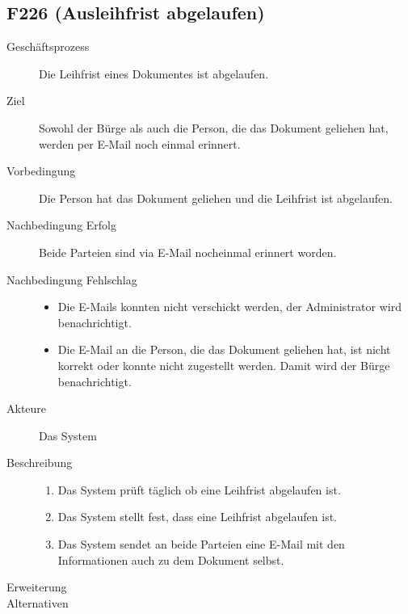 \subsection{F226 (Ausleihfrist abgelaufen)}
\begin{description}
  \item[Geschäftsprozess]Die Leihfrist eines Dokumentes ist abgelaufen.
  \item[Ziel]Sowohl der Bürge als auch die Person, die das Dokument geliehen hat, werden per E-Mail noch einmal erinnert.
  \item[Vorbedingung]Die Person hat das Dokument geliehen und die Leihfrist ist abgelaufen.
  \item[Nachbedingung Erfolg]Beide Parteien sind via E-Mail nocheinmal erinnert worden.
  \item[Nachbedingung Fehlschlag]
    \begin{itemize}
      \item Die E-Mails konnten nicht verschickt werden, der Administrator wird benachrichtigt.
      \item Die E-Mail an die Person, die das Dokument geliehen hat, ist nicht korrekt oder konnte nicht zugestellt werden. Damit wird der Bürge benachrichtigt.
    \end{itemize}
  \item[Akteure]Das System
  \item[Beschreibung]\hfill
    \begin{enumerate}
      \item Das System prüft täglich ob eine Leihfrist abgelaufen ist.
      \item Das System stellt fest, dass eine Leihfrist abgelaufen ist.
      \item Das System sendet an beide Parteien eine E-Mail mit den Informationen auch zu dem Dokument selbst.
    
    \end{enumerate}
  \item[Erweiterung]
  \item[Alternativen]
\end{description}

